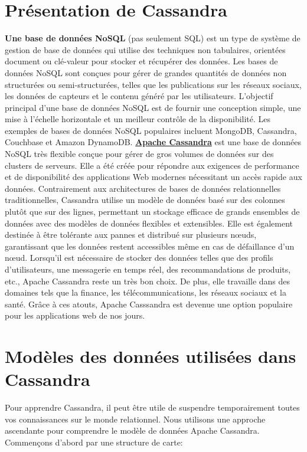 \documentclass[12pt, letterpaper]{report}
\begin{document}
\section{Présentation de Cassandra}
\textbf{Une base de données NoSQL} (pas seulement SQL) est un type de système de gestion de base de données qui utilise des techniques non tabulaires, orientées document ou clé-valeur pour stocker et récupérer des données. Les bases de données NoSQL sont conçues pour gérer de grandes quantités de données non structurées ou semi-structurées, telles que les publications sur les réseaux sociaux, les données de capteurs et le contenu généré par les utilisateurs.\newline
L'objectif principal d'une base de données NoSQL est de fournir une conception simple, une mise à l'échelle horizontale et un meilleur contrôle de la disponibilité.
\newline
Les exemples de bases de données NoSQL populaires incluent MongoDB, Cassandra, Couchbase et Amazon DynamoDB.
\newline
\underline{\textbf{Apache Cassandra}} est une base de données NoSQL très flexible conçue pour gérer de gros volumes de données sur des clusters de serveurs. Elle a été créée pour répondre aux exigences de performance et de disponibilité des applications Web modernes nécessitant un accès rapide aux données.\newline
Contrairement aux architectures de bases de données relationnelles traditionnelles, Cassandra utilise un modèle de données basé sur des colonnes plutôt que sur des lignes, permettant un stockage efficace de grands ensembles de données avec des modèles de données flexibles et extensibles. Elle est également destinée à être tolérante aux pannes et distribué sur plusieurs nœuds, garantissant que les données restent accessibles même en cas de défaillance d'un nœud.
\newline
Lorsqu'il est nécessaire de stocker des données telles que des profils d'utilisateurs, une messagerie en temps réel, des recommandations de produits, etc., Apache Cassandra reste un très bon choix. De plus, elle travaille dans des domaines tels que la finance, les télécommunications, les réseaux sociaux et la santé. 
\newline
Grâce à ces atouts, Apache Casssandra est devenue une option populaire pour les applications web de nos jours.

\section{Modèles des données utilisées dans Cassandra}
\justifying
Pour apprendre Cassandra, il peut être utile de suspendre temporairement toutes vos connaissances sur le monde relationnel. Nous utilisons une approche ascendante pour comprendre le modèle de données Apache Cassandra. Commençons d'abord par une structure de carte:
\end{document}
